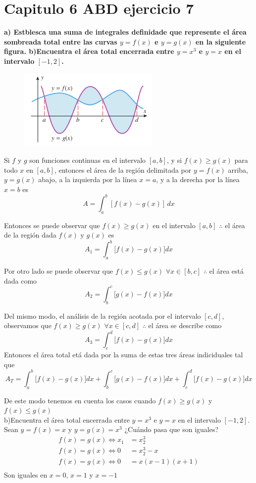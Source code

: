 \chapter*{Capitulo 6 ABD ejercicio 7}
\textbf{a) Estblesca una suma de integrales definidade que represente el área sombreada total entre las curvas $y=f(x)$ e $y=g(x)$ en la siguiente figura. b)Encuentra el área total encerrada entre $y=x^3$ e $y=x$ en el intervalo $[-1, 2]$.}
\begin{figure}[!hbt]
	\includegraphics[height = 0.20\textheight]{recursos/image.png}\par
\end{figure}

Si \( f \) y \( g \) son funciones continuas en el intervalo \([a, b]\), y si \( f(x) \geq g(x) \) para todo \( x \) en \([a, b]\), entonces el área de la región delimitada por \( y = f(x) \) arriba, \( y = g(x) \) abajo, a la izquierda por la línea \( x = a \), y a la derecha por la línea \( x = b \) es \[ A = \int_{a}^{b} [f(x) - g(x)] \, dx \]

Entonces se puede observar que $f(x)\geq g(x)$ en el intervalo $[a,b]$ $\therefore$ el área de la región dada  $f(x)$ y $ g(x)$ es $$A_1=\int_{a}^{b}\bigg[f(x)-g(x)\bigg]dx$$

Por otro lado se puede observar que $f(x)\leq g(x)$ $\forall x\in[b,c]$ $\therefore$ el área está dada como $$A_2=\int_{b}^{c}\bigg[g(x)-f(x)\bigg]dx$$

Del mismo modo, el análisis de la región acotada por el intervalo $[c,d]$, observamos que $f(x)\geq g(x)$ $\forall x\in[c,d]$ $\therefore$ el área se describe como $$A_3=\int_{c}^{d}\bigg[f(x)-g(x)\bigg]dx$$
Entonces el área total etá dada por la suma de estas tres áreas indiciduales tal que
$$A_T=\int_{a}^{b}\bigg[f(x)-g(x)\bigg]dx + \int_{b}^{c}\bigg[g(x)-f(x)\bigg]dx + \int_{c}^{d}\bigg[f(x)-g(x)\bigg]dx$$

De este modo tenemos en cuenta los casos cuando $f(x)\geq g(x)$ y $f(x)\leq g(x)$
\\
b)Encuentra el área total encerrada entre $y=x^3$ e $y=x$ en el intervalo $[-1, 2]$.
Sean $y=f(x)=x$ y $y=g(x)=x^3$
¿Cuándo pasa que son iguales?
\begin{align*}
	f(x)=g(x)\iff x_1 & =x_2^3       \\
	f(x)=g(x)\iff 0   & =x_2^3-x     \\
	f(x)=g(x)\iff 0   & =x(x-1)(x+1) \\
\end{align*}
Son iguales en $x=0$, $x=1$ y $x=-1$


